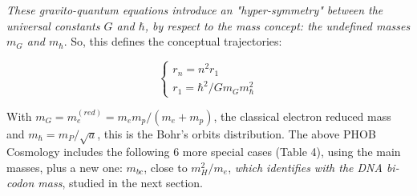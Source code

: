 \documentclass[a4paper,9pt]{article}
\newcounter{row}
\begin{document}
\textit{These gravito-quantum equations introduce an "hyper-symmetry" between the universal constants $G$ and $\hbar$, by respect to the mass concept: the undefined masses $m_G$ and $m_{\hbar}$}. So, this defines the conceptual trajectories:

\begin{equation}\label{Eq12}
 \left\{
    \begin{array}{ll}
        r_n = n^2 r_1 \\
        
        r_1 = \hbar^2/Gm_Gm_{\hbar}^2   
    \end{array}
\right.
\end{equation}

With $m_G = m_e^{(red)} = m_em_p/(m_e+m_p)$, the classical electron reduced mass and $m_{\hbar} = m_P/\sqrt a$, this is the Bohr's orbits distribution. The above PHOB Cosmology includes the following 6 more special cases (Table 4), using the main masses, plus a new one: $m_{bc}$, close to $m_H^2/m_e$, \textit{which identifies with the DNA bi-codon mass}, studied in the next section.

    
    
        
        
        
         
\end{document}
